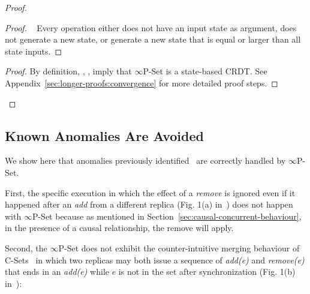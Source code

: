 \documentclass[10pt, oneside]{article}   	%
\begin{document}
\begin{proof}
	
	\begin{proof}
		\pfsketch~ Every operation either does not have an input state as argument, does not generate a new state, or generate a new state that is equal or larger than all state inputs.
	\end{proof}

	\qedstep
	\begin{proof}
		\pf By definition, , ,  imply that $\infty$P-Set is a state-based CRDT. See Appendix~\ref{sec:longer-proofs:convergence} for more detailed proof steps.
	\end{proof}
\end{proof}


\subsection{Known Anomalies Are Avoided}

We show here that anomalies previously identified~\cite{bieniusa:hal-00769554} are correctly handled by $\infty$P-Set. 

First, the specific execution in which the effect of a \textit{remove} is ignored even if it happened after an \textit{add} from a different replica (Fig. 1(a) in~\cite{bieniusa:hal-00769554}) does not happen with $\infty$P-Set because as mentioned in Section~\ref{sec:causal-concurrent-behaviour}, in the presence of a causal relationship, the remove will apply.

Second,  the $\infty$P-Set does not exhibit the counter-intuitive merging behaviour of C-Sets~\cite{bieniusa:hal-00769554} in which two replicas may both issue a sequence of \textit{add(e)} and \textit{remove(e)} that ends in an \textit{add(e)} while $e$ is not in the set after synchronization (Fig. 1(b) in~\cite{bieniusa:hal-00769554}):
\end{document}
